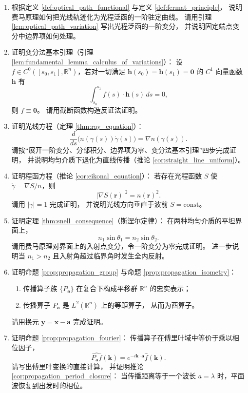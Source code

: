 \begin{enumerate}[leftmargin=3em, label=\textbf{题 \arabic*}]
    \item 根据定义 \ref{def:optical_path_functional} 与定义 \ref{def:fermat_principle}，
    说明费马原理如何把光线轨迹化为光程泛函的一阶驻定曲线。
    请用引理 \ref{lem:optical_path_variation} 写出光程泛函的一阶变分，
    并说明固定端点变分中边界项如何处理。

    \item 证明变分法基本引理（引理 \ref{lem:fundamental_lemma_calculus_of_variations}）：
    设 $f\in C^0([s_0,s_1],\mathbb{R}^n)$，若对一切满足
    $\mathbf{h}(s_0)=\mathbf{h}(s_1)=\mathbf{0}$ 的 $C^1$ 向量函数 $\mathbf{h}$ 有
    \[
    \int_{s_0}^{s_1}f(s)\cdot\mathbf{h}(s)\,ds=0,
    \]
    则 $f\equiv\mathbf{0}$。
    请用截断函数构造反证法证明。

    \item 证明光线方程（定理 \ref{thm:ray_equation}）：
    \[
    \frac{d}{ds}\bigl(n(\gamma(s))\dot\gamma(s)\bigr)=\nabla n(\gamma(s)).
    \]
    请按“展开一阶变分、分部积分、边界项为零、变分法基本引理”四步完成证明，
    并说明均匀介质下退化为直线传播（推论 \ref{cor:straight_line_uniform}）。

    \item 证明程函方程（推论 \ref{cor:eikonal_equation}）：
    若存在光程函数 $S$ 使 $\dot\gamma=\nabla S/n$，则
    \[
    |\nabla S(\mathbf{r})|^2=n(\mathbf{r})^2.
    \]
    请用 $|\dot\gamma|=1$ 完成证明，
    并说明光线方向垂直于波前 $S=\text{const}$。

    \item 证明定理 \ref{thm:snell_consequence}（斯涅尔定律）：
    在两种均匀介质的平坦界面上，
    \[
    n_1\sin\theta_1=n_2\sin\theta_2.
    \]
    请用费马原理对界面上的入射点变分，令一阶变分为零完成证明。
    进一步说明当 $n_1>n_2$ 且入射角超过临界角时发生全内反射。

    \item 证明命题 \ref{prop:propagation_group} 与命题 \ref{prop:propagation_isometry}：
    \begin{enumerate}[label=(\roman*)]
        \item 传播算子族 $\{P_{\mathbf{a}}\}$ 在复合下构成平移群 $\mathbb{R}^n$ 的忠实表示；
        \item 传播算子 $P_{\mathbf{a}}$ 是 $L^2(\mathbb{R}^n)$ 上的等距算子，
              从而为酉算子。
    \end{enumerate}
    请用换元 $\mathbf{y}=\mathbf{x}-\mathbf{a}$ 完成证明。

    \item 证明命题 \ref{prop:propagation_fourier}：
    传播算子在傅里叶域中等价于乘以相位因子，
    \[
    \widehat{P_{\mathbf{a}}f}(\mathbf{k})=e^{-i\mathbf{k}\cdot\mathbf{a}}\hat{f}(\mathbf{k}).
    \]
    请写出傅里叶变换的直接计算，
    并证明推论 \ref{cor:propagation_period_closure}：
    当传播距离等于一个波长 $a=\lambda$ 时，平面波恢复到出发时的相位。


\end{enumerate}
